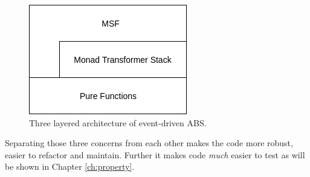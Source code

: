 \begin{figure}
	\centering
	\includegraphics[width=.4\textwidth, angle=0]{./fig/eventdriven/3layers.png}
	\caption[Three layered architecture of event-driven ABS]{Three layered architecture of event-driven ABS.}
	\label{fig:3layer_system}
\end{figure}

Separating those three concerns from each other makes the code more robust, easier to refactor and maintain. Further it makes code \textit{much} easier to test as will be shown in Chapter \ref{ch:property}. 


